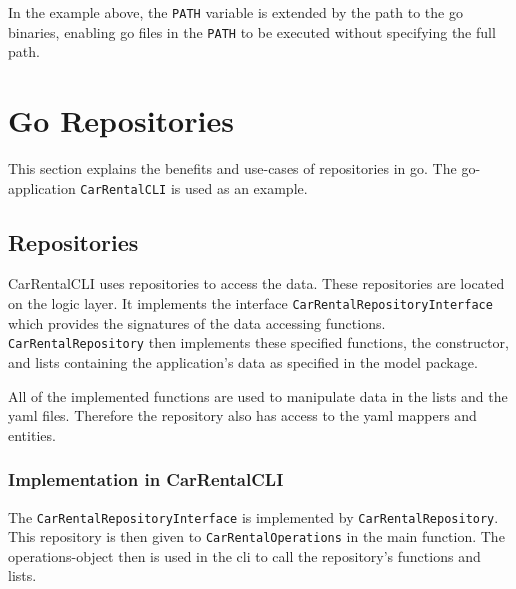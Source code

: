 In the example above, the \texttt{PATH} variable is extended by the path to the go binaries, enabling go files in the \texttt{PATH} to be executed without specifying the full path.

\section{Go Repositories}
\label{sec:go_repositories}
This section explains the benefits and use-cases of repositories in go.
The go-application \texttt{CarRentalCLI} is used as an example.

\subsection{Repositories}
CarRentalCLI uses repositories to access the data.
These repositories are located on the logic layer.
It implements the interface \texttt{CarRentalRepositoryInterface} which provides the signatures of the data accessing functions.
\texttt{CarRentalRepository} then implements these specified functions, the constructor, and lists containing the application's data as specified in the model package.

All of the implemented functions are used to manipulate data in the lists and the yaml files.
Therefore the repository also has access to the yaml mappers and entities.

\subsubsection*{Implementation in CarRentalCLI}
The \texttt{CarRentalRepositoryInterface} is implemented by \texttt{CarRentalRepository}.
This repository is then given to \texttt{CarRentalOperations} in the main function.
The operations-object then is used in the cli to call the repository's functions and lists.

